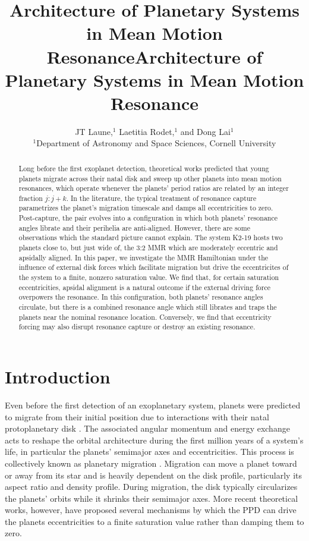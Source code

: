 \documentclass[usenatbib,onecolumn]{mnras}
\title[MMR Architecture]{Architecture of Planetary Systems in Mean Motion Resonance}
\author[Laune et al.]{
JT Laune,$^{1}$
Laetitia Rodet,$^{1}$
and Dong Lai$^{1}$
\\
$^{1}$Department of Astronomy and Space Sciences, Cornell University\\}
\date{}
\title{Architecture of Planetary Systems in Mean Motion Resonance}
\begin{document}
\maketitle
\begin{abstract}
  Long before the first exoplanet detection, theoretical
  works predicted that young planets migrate across their natal disk
  and sweep up other planets into mean motion resonances, which
  operate whenever the planets' period ratios are related by an
  integer fraction $j:j+k$.  In the literature, the typical treatment
  of resonance capture parametrizes the planet's migration timescale
  and damps all eccentricities to zero.  Post-capture, the pair
  evolves into a configuration in which both planets' resonance angles
  librate and their perihelia are anti-aligned.  However, there are
  some observations which the standard picture cannot explain. The
  system K2-19 hosts two planets close to, but just wide of, the 3:2
  MMR which are moderately eccentric and apsidally aligned.  In this
  paper, we investigate the MMR Hamiltonian under the influence of
  external disk forces which facilitate migration but drive the
  eccentricites of the system to a finite, nonzero saturation value.
  We find that, for certain saturation eccentricities, apsidal
  alignment is a natural outcome if the external driving force
  overpowers the resonance.  In this configuration, both planets'
  resonance angles circulate, but there is a combined resonance angle
  which still librates and traps the planets near the nominal
  resonance location.  Conversely, we find that eccentricity forcing
  may also disrupt resonance capture or destroy an existing
  resonance.
\end{abstract}

\section{Introduction}
\label{sec:org4bcdd04}
Even before the first detection of an exoplanetary system, planets
were predicted to migrate from their initial position due to
interactions with their natal protoplanetary disk
\citep[PPD, ][]{lin79_tidal_torques_accret_discs_binar,goldreich_excitation_1979,goldreich_disk-satellite_1980-1}.
The associated angular momentum and energy exchange acts to reshape
the orbital architecture during the first million years of a system's
life, in particular the planets' semimajor axes and eccentricities.
This process is collectively known as planetary migration
\citep{nelson_planetary_2018}.  Migration can move a planet toward or
away from its star and is heavily dependent on the disk profile,
particularly its aspect ratio and density profile.  During migration,
the disk typically circularizes the planets' orbits while it shrinks
their semimajor axes.  More recent theoretical works, however, have
proposed several mechanisms by which the PPD can drive the planets
eccentricities to a finite saturation value rather than damping them
to zero.
\end{document}
